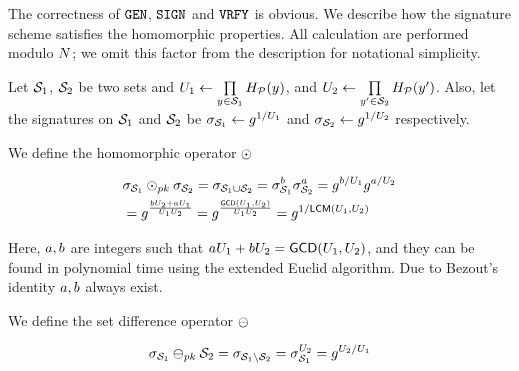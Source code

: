 %
The correctness of $\keyGen$, $\signingAlg$ and $\verify$ is obvious. We describe how the signature scheme satisfies the homomorphic properties. All calculation are performed modulo $N$; we omit this factor from the description for notational simplicity. 

Let  $\genericSetVar[1]$, $\genericSetVar[2]$ be two sets and $\accSet[1] \gets 
\prod\limits_{\genericCInputElmt \in \genericSetVar[1]} \primeRO(\genericCInputElmt)$, and $\accSet[2] \gets 
\prod\limits_{\genericCInputElmt' \in \genericSetVar[2]}  \primeRO(\genericCInputElmt')$. Also, let the signatures on $\genericSetVar[1]$ and $\genericSetVar[2]$ be $\genericSig[\genericSetVar[1]] \assign \qrGen^{1/\accSet[1]}$ and $\genericSig[\genericSetVar[2]] \assign \qrGen^{1/\accSet[2]}$ respectively. %


\itemListStart
\item {} We define the homomorphic operator $\sigHomomorphism$ 


\begin{align*}
& \genericSig[\genericSetVar[1]] \sigHomomorphism[\pubKey] \genericSig[\genericSetVar[2]] = \genericSig[\genericSetVar[1] \cup \genericSetVar[2]] = 
\genericSig[\genericSetVar[1]]^{\euclideanConst[2]}  \genericSig[\genericSetVar[2]]^{\euclideanConst[1]} = \qrGen^{\euclideanConst[2]/\accSet[1]} \qrGen^{\euclideanConst[1]/\accSet[2]} \\
&  = \qrGen^{\frac{\euclideanConst[2] \accSet[2] + \euclideanConst[1] \accSet[1]}{\accSet[1] \accSet[2]}} =\qrGen^{\frac{\gcd(\accSet[1], \accSet[2])}{\accSet[1] \accSet[2]}} = \qrGen^{1/\lcm(\accSet[1], \accSet[2])} \label{eq}
\end{align*}


Here, $\euclideanConst[1], \euclideanConst[2]$ are integers such that $\euclideanConst[1]\accSet[1] + \euclideanConst[2] \accSet[2] = \gcd(\accSet[1], \accSet[2])$, and they can be found in polynomial time using the extended Euclid algorithm. Due to Bezout's identity $\euclideanConst[1], \euclideanConst[2]$ always exist. 






\item {} We define the set difference operator $\sigMinus$ 

\[
\genericSig[\genericSetVar[1]] \sigMinus[\pubKey] \genericSetVar[2] = \genericSig[\genericSetVar[1] \setminus \genericSetVar[2]] = \genericSig[\genericSetVar[1]]^{\accSet[2]} = \qrGen^{\accSet[2]/\accSet[1]}
\]

